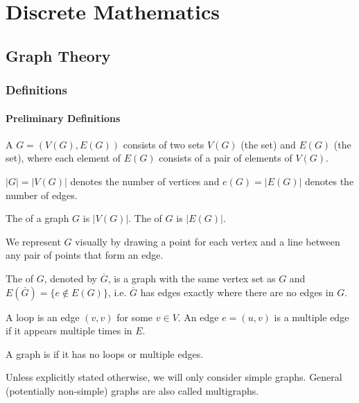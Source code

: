 \part{Discrete Mathematics}
\chapter{Graph Theory}

\section{Definitions}
\subsection{Preliminary Definitions}
\begin{definition}
A  $G = (V(G),E(G))$ consists of two sets $V(G)$ (the  set) and $E(G)$ (the  set), where each element of $E(G)$ consists of a pair of elements of $V(G)$. 
\end{definition}

\begin{notation}
$|G|=|V(G)|$ denotes the number of vertices and $e(G) =|E(G)|$ denotes the number of edges.
\end{notation}

The  of a graph $G$ is $|V(G)|$. The  of $G$ is $|E(G)|$.

We represent $G$ visually by drawing a point for each vertex and a line between any pair of points that form an edge.

The  of $G$, denoted by $\overline{G}$, is a graph with the same vertex set as $G$ and $E(\overline{G}) = \{e \notin E(G)\}$, i.e. $\overline{G}$ has edges exactly where there are no edges in $G$.

\begin{definition}
A loop is an edge $(v,v)$ for some $v \in V$. An edge $e=(u,v)$ is a multiple edge if it appears multiple times in $E$. 

A graph is  if it has no loops or multiple edges.
\end{definition}

\begin{remark}
Unless explicitly stated otherwise, we will only consider simple graphs. General (potentially non-simple) graphs are also called multigraphs.
\end{remark}

